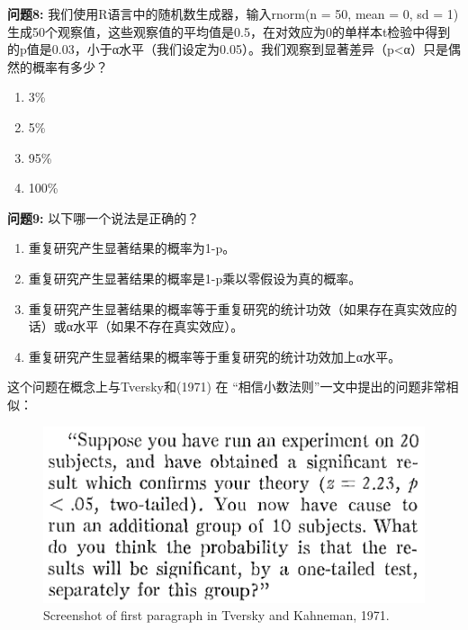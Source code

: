 \documentclass[
  letterpaper,
  DIV=11,
  numbers=noendperiod]{scrreprt}
\providecommand{\tightlist}{%
  \setlength{\itemsep}{0pt}\setlength{\parskip}{0pt}}\usepackage{longtable,booktabs,array}
\begin{document}
\textbf{问题8:} 我们使用R语言中的随机数生成器，输入rnorm(n = 50, mean =
0, sd =
1)生成50个观察值，这些观察值的平均值是0.5，在对效应为0的单样本t检验中得到的p值是0.03，小于α水平（我们设定为0.05）。我们观察到显著差异（p\textless α）只是偶然的概率有多少？

\begin{enumerate}
\def\labelenumi{\Alph{enumi})}
\tightlist
\item
  3\%
\item
  5\%
\item
  95\%
\item
  100\%
\end{enumerate}

\textbf{问题9:} 以下哪一个说法是正确的？

\begin{enumerate}
\def\labelenumi{\Alph{enumi})}
\tightlist
\item
  重复研究产生显著结果的概率为1-p。
\item
  重复研究产生显著结果的概率是1-p乘以零假设为真的概率。
\item
  重复研究产生显著结果的概率等于重复研究的统计功效（如果存在真实效应的话）或α水平（如果不存在真实效应）。
\item
  重复研究产生显著结果的概率等于重复研究的统计功效加上α水平。
\end{enumerate}

这个问题在概念上与Tversky和(1971) 在
``相信小数法则''一文中提出的问题非常相似：

\begin{figure}

{\centering \includegraphics[width=1\textwidth,height=\textheight]{images/belieflawsmallnumers.png}

}

\caption{\label{fig-smallnumbers}Screenshot of first paragraph in
Tversky and Kahneman, 1971.}

\end{figure}
\end{document}
